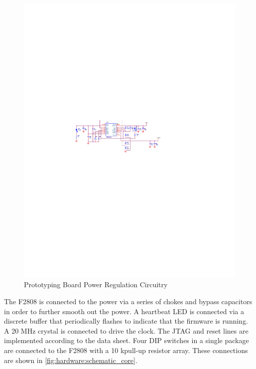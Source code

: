 \begin{figure}[ptb]
	\begin{centering}
		\includegraphics[scale=1.3]{Hardware/Figures/hardware-schematic_power_regulation.pdf}
		\caption{Prototyping Board Power Regulation Circuitry}
		\label{fig:hardware:schematic_power_regulation}
	\end{centering}
\end{figure}

The F2808 is connected to the power via a series of chokes and bypass capacitors in order to further smooth out the power. A heartbeat LED is connected via a discrete buffer that periodically flashes to indicate that the firmware is running. A 20 MHz crystal is connected to drive the clock. The JTAG and reset lines are implemented according to the data sheet. Four DIP switches in a single package are connected to the F2808 with a 10 k\textohm pull-up resistor array. These connections are shown in \ref{fig:hardware:schematic_core}.

